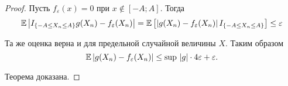 \begin{proof}
    Пусть $f_{\varepsilon}(x) = 0$ при $x \not\in [-A; A]$. Тогда
    \[ \mathbb{E} \left| I_{\{-A \le X_n \le A\}} g(X_n) - f_{\varepsilon}(X_n) \right| = \mathbb{E} \left[ \left| g(X_n) - f_{\varepsilon}(X_n) \right| I_{\{-A \le X_n \le A\}} \right] \le \varepsilon \]
    
    Та же оценка верна и для предельной случайной величины $X$. Таким образом
    \[ \mathbb{E} \left| g(X_n) - f_{\varepsilon}(X_n) \right| \le \sup\,|g| \cdot 4\varepsilon + \varepsilon. \]
    
    Теорема доказана.
\end{proof}
